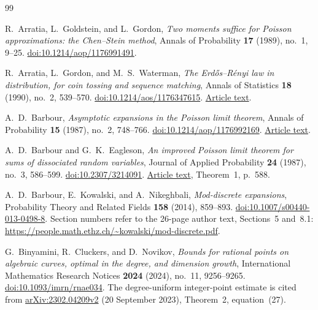 \begin{thebibliography}{99}

R.~Arratia, L.~Goldstein, and L.~Gordon,
\emph{Two moments suffice for Poisson approximations:
the Chen--Stein method},
Annals of Probability \textbf{17} (1989), no.~1, 9--25.
\href{https://doi.org/10.1214/aop/1176991491}
{doi:10.1214/aop/1176991491}.

R.~Arratia, L.~Gordon, and M.~S.~Waterman,
\emph{The Erd\H{o}s--R\'enyi law in distribution, for coin tossing
and sequence matching},
Annals of Statistics \textbf{18} (1990), no.~2, 539--570.
\href{https://doi.org/10.1214/aos/1176347615}
{doi:10.1214/aos/1176347615}.
\href{https://dornsife.usc.edu/msw/wp-content/uploads/sites/236/2023/09/msw-093.pdf}
{Article text}.

A.~D.~Barbour,
\emph{Asymptotic expansions in the Poisson limit theorem},
Annals of Probability \textbf{15} (1987), no.~2, 748--766.
\href{https://doi.org/10.1214/aop/1176992169}
{doi:10.1214/aop/1176992169}.
\href{https://user.math.uzh.ch/barbour/pub/Barbour/AsympExpanPois.pdf}
{Article text}.

A.~D.~Barbour and G.~K.~Eagleson,
\emph{An improved Poisson limit theorem for sums of dissociated
random variables},
Journal of Applied Probability \textbf{24} (1987), no.~3, 586--599.
\href{https://doi.org/10.2307/3214091}
{doi:10.2307/3214091}.
\href{https://user.math.uzh.ch/barbour/pub/Barbour/BEagleson_ImprovedPoisson.pdf}
{Article text}, Theorem~1, p.~588.

A.~D.~Barbour, E.~Kowalski, and A.~Nikeghbali,
\emph{Mod-discrete expansions},
Probability Theory and Related Fields \textbf{158}
(2014), 859--893.
\href{https://doi.org/10.1007/s00440-013-0498-8}
{doi:10.1007/s00440-013-0498-8}.
Section numbers refer to the 26-page author text, Sections~5 and~8.1:
\url{https://people.math.ethz.ch/~kowalski/mod-discrete.pdf}.

G.~Binyamini, R.~Cluckers, and D.~Novikov,
\emph{Bounds for rational points on algebraic curves, optimal
in the degree, and dimension growth},
International Mathematics Research Notices \textbf{2024} (2024),
no.~11, 9256--9265.
\href{https://doi.org/10.1093/imrn/rnae034}
{doi:10.1093/imrn/rnae034}.
The degree-uniform integer-point estimate is cited from
\href{https://arxiv.org/abs/2302.04209v2}
{arXiv:2302.04209v2} (20 September 2023),
Theorem~2, equation~(27).


\end{thebibliography}

